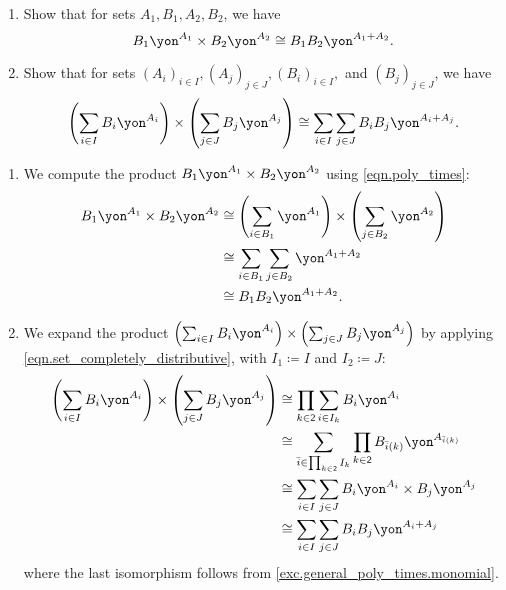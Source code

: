\documentclass[Book-Poly]{subfiles}
\begin{document}
\begin{exercise} \label{exc.general_poly_times}
\begin{enumerate}
    \item \label{exc.general_poly_times.monomial} Show that for sets $A_1, B_1, A_2, B_2$, we have
    \[
        B_1\yon^{A_1} \times B_2\yon^{A_2} \iso B_1 B_2\yon^{A_1 + A_2}.
    \]
    \item \label{exc.general_poly_times.polynomial} Show that for sets $(A_i)_{i \in I},(A_j)_{j \in J},(B_i)_{i \in I},$ and $(B_j)_{j \in J}$, we have
    \[
        \left(\sum_{i \in I} B_i\yon^{A_i}\right) \times \left(\sum_{j \in J} B_j\yon^{A_j}\right) \iso \sum_{i \in I} \sum_{j \in J} B_i B_j \yon^{A_i + A_j}.
    \]
\end{enumerate}
\begin{solution}
\begin{enumerate}
    \item We compute the product $B_1\yon^{A_1} \times B_2\yon^{A_2}$ using \eqref{eqn.poly_times}:
    \begin{align*}
        B_1\yon^{A_1} \times B_2\yon^{A_2} &\iso \left(\sum_{i \in B_1} \yon^{A_1}\right) \times \left(\sum_{j \in B_2} \yon^{A_2}\right) \\
        &\iso \sum_{i \in B_1} \sum_{j \in B_2} \yon^{A_1 + A_2} \\
        &\iso B_1 B_2\yon^{A_1 + A_2}.
    \end{align*}

    \item We expand the product $\left(\sum_{i \in I} B_i\yon^{A_i}\right) \times \left(\sum_{j \in J} B_j\yon^{A_j}\right)$ by applying \eqref{eqn.set_completely_distributive}, with $I_1 \coloneqq I$ and $I_2 \coloneqq J$:
    \begin{align*}
        \left(\sum_{i \in I} B_i\yon^{A_i}\right) \times \left(\sum_{j \in J} B_j\yon^{A_j}\right) &\iso \prod_{k \in \2} \sum_{i \in I_k} B_i\yon^{A_i} \\
        &\iso \sum_{\bar{i} \in \prod_{k \in \2} I_k} \prod_{k \in \2} B_{\bar{i}(k)}\yon^{A_{\bar{i}(k)}} \\
        &\iso \sum_{i \in I} \sum_{j \in J} B_i\yon^{A_i} \times B_j\yon^{A_j} \\
        &\iso \sum_{i \in I} \sum_{j \in J} B_i B_j \yon^{A_i + A_j}
    \end{align*}
    where the last isomorphism follows from \cref{exc.general_poly_times.monomial}.
\end{enumerate}
\end{solution}
\end{exercise}
\end{document}
